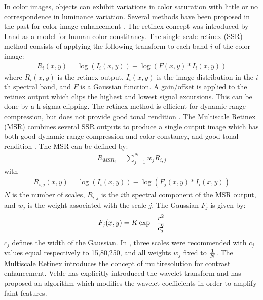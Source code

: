 In color images, objects can exhibit variations in color saturation
with little or no correspondence in luminance variation. 
Several methods have been proposed in the past for color image
enhancement \cite{col:toet92}.
  The retinex concept was introduced by Land \cite{col:land86} as a model
for human color constitancy. 
The single scale retinex (SSR) method \cite{col:jobson97a} consists of
applying the following transform to each band $i$ of the color image:
\begin{eqnarray}
R_i(x,y) = \log( I_i(x,y)) - \log(F(x,y) * I_i(x,y)) 
\end{eqnarray}
where $R_i(x,y)$ is the retinex output, $I_i(x,y)$ is the image 
distribution in the $i$th spectral band, and $F$ is a Gaussian function.
A gain/offset is applied to the retinex output which clips the highest and
lowest signal excursions. This can be done by a k-sigma clipping.
The retinex method is efficient for dynamic range compression, but does not provide good
tonal rendition \cite{col:rahman96}. 
The Multiscale Retinex (MSR) combines several SSR outputs to produce 
a single output image which has both good dynamic range compression and
color constancy, and good tonal rendition \cite{col:jobson97b}.
The MSR can be defined by:
\begin{eqnarray}
R_{MSR_i} = \sum_{j=1}^N w_j R_{i,j}
\end{eqnarray}
with 
\begin{eqnarray}
R_{i,j}(x,y) = \log( I_i(x,y)) - \log(F_j(x,y) * I_i(x,y)) 
\end{eqnarray}
$N$ is the number of scales, $R_{i,j}$ is the $i$th spectral
component of the MSR output, and $w_j$ is the weight associated with
the scale $j$. The Gaussian $F_j$ is given by:
\begin{eqnarray}
F_j(x,y) = K \exp{- {r^2 \over c_j^2}}
\end{eqnarray}
$c_j$ defines the width of the Gaussian.
In \cite{col:jobson97b}, three scales were recommended with $c_j$ values
equal respectively to 15,80,250, and all weights $w_j$ fixed to ${1 \over N}$.
The Multiscale Retinex introduces the concept of multiresolution for
contrast enhancement. Velde \cite{col:velde99} has explicitly introduced
the wavelet transform and has proposed an algorithm which modifies the 
wavelet coefficients in order to amplify faint features.
